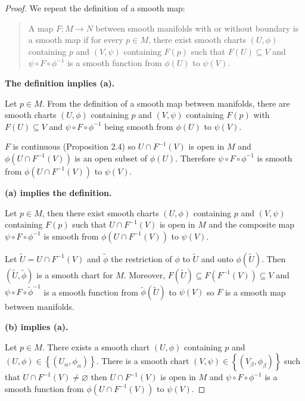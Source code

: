 \begin{proof}
    We repeat the definition of a smooth map:
    \begin{quotation}
        A map \( F: M \to N \) between smooth manifolds with or without boundary is a smooth map if for every \( p \in M \), there exist smooth charts \( (U, \phi) \) containing \( p \) and \( (V, \psi) \) containing \( F(p) \) such that \( F(U) \subseteq V \) and \( \psi \circ F \circ \phi^{-1} \) is a smooth function from \( \phi(U) \) to \( \psi(V) \).
    \end{quotation}

    \textbf{The definition implies (a).}

    Let \( p \in M \). From the definition of a smooth map between manifolds, there are smooth charts \( (U, \phi) \) containing \( p \) and \( (V, \psi) \) containing \( F(p) \) with \( F(U) \subseteq V \) and \( \psi \circ F \circ \phi^{-1} \) being smooth from \( \phi(U) \) to \( \psi(V) \).

    \( F \) is continuous (Proposition 2.4) so \( U \cap F^{-1}(V) \) is open in \( M \) and \( \phi(U \cap F^{-1}(V)) \) is an open subset of \( \phi(U) \). Therefore \( \psi \circ F \circ \phi^{-1} \) is smooth from \( \phi(U \cap F^{-1}(V)) \) to \( \psi(V) \).

    \textbf{(a) implies the definition.}

    Let \( p \in M \), then there exist smooth charts \( (U, \phi) \) containing \( p \) and \( (V, \psi) \) containing \( F(p) \) such that \( U \cap F^{-1}(V) \) is open in \( M \) and the composite map \( \psi \circ F \circ \phi^{-1} \) is smooth from \( \phi(U \cap F^{-1}(V)) \) to \( \psi(V) \).

    Let \( \widetilde{U} = U \cap F^{-1}(V) \) and \( \widetilde{\phi} \) the restriction of \( \phi \) to \( \widetilde{U} \) and onto \( \phi(\widetilde{U}) \). Then \( (\widetilde{U}, \widetilde{\phi}) \) is a smooth chart for \( M \). Moreover, \( F(\widetilde{U}) \subseteq F(F^{-1}(V)) \subseteq V \) and \( \psi \circ F \circ \widetilde{\phi}^{-1} \) is a smooth function from \( \widetilde{\phi}(\widetilde{U}) \) to \( \psi(V) \) so \( F \) is a smooth map between manifolds.

    \textbf{(b) implies (a).}

    Let \( p \in M \). There exists a smooth chart \( (U, \phi) \) containing \( p \) and \( (U, \phi) \in \left\{ (U_{\alpha}, \phi_{\alpha}) \right\} \). There is a smooth chart \( (V, \psi) \in \left\{ (V_{\beta}, \phi_{\beta}) \right\} \) such that \( U \cap F^{-1}(V) \ne \varnothing \) then \( U \cap F^{-1}(V) \) is open in \( M \) and \( \psi \circ F \circ \phi^{-1} \) is a smooth function from \( \phi(U \cap F^{-1}(V)) \) to \( \psi(V) \).


\end{proof}
